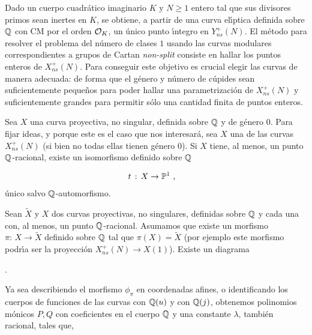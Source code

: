 Dado un cuerpo cuadr\'{a}tico imaginario $K$ y $N\geq 1$ entero tal que sus
divisores primos sean inertes en $K$, se obtiene, a partir de una curva
el\'{\i}ptica definida sobre $\bb{Q}$ con CM por el orden $\cal{O}_{K}$, un
\'{u}nico punto \'{\i}ntegro en $Y_{ns}^{+}(N)$. El m\'{e}todo para resolver el
problema del n\'{u}mero de clases $1$ usando las curvas modulares correspondientes
a grupos de Cartan \textit{non-split} consiste en hallar los puntos enteros de
$X_{ns}^{+}(N)$. Para conseguir este objetivo es crucial elegir las curvas de
manera adecuada: de forma que el g\'{e}nero y n\'{u}mero de c\'{u}pides sean
suficientemente peque\~{n}os para poder hallar una parametrizaci\'{o}n de
$X_{ns}^{+}(N)$ y suficientemente grandes para permitir s\'{o}lo una cantidad
finita de puntos enteros.

Sea $X$ una curva proyectiva, no singular, definida sobre $\bb{Q}$ y de g\'{e}nero
$0$. Para fijar ideas, y porque este es el caso que nos interesar\'{a}, sea $X$
una de las curvas $X_{ns}^{+}(N)$ (si bien no todas ellas tienen g\'{e}nero %
$0$). Si $X$ tiene, al menos, un punto %
$\bb{Q}$-racional, existe un isomorfismo definido sobre $\bb{Q}$

\begin{align*}
 t & \,:\,X\rightarrow\bb{P}^{1}
 \text{ ,}
\end{align*}
\'{u}nico salvo $\bb{Q}$-automorfismo.

Sean $\widetilde{X}$ y $X$ dos curvas %
proyectivas, no singulares, definidas sobre $\bb{Q}$ y cada una con, al menos,
un punto $\bb{Q}$-racional. Asumamos que existe un morfismo
$\pi:\,X\rightarrow\widetilde{X}$ definido sobre $\bb{Q}$ tal que
$\pi(X)=\widetilde{X}$ (por ejemplo este morfismo podr\'{\i}a ser la
proyecci\'{o}n $X_{ns}^{+}(N)\rightarrow X(1)$). Existe un diagrama

\begin{center}
 .
\end{center}
Ya sea describiendo el morfismo $\phi_{\pi}$ en coordenadas afines, o
identificando los cuerpos de funciones de las curvas con $\bb{Q}(u)$ y
con $\bb{Q}(j)$, obtenemos polinomios m\'{o}nicos $P,Q$ con coeficientes en el
cuerpo $\bb{Q}$ y una constante $\lambda$, tambi\'{e}n racional, tales que,

